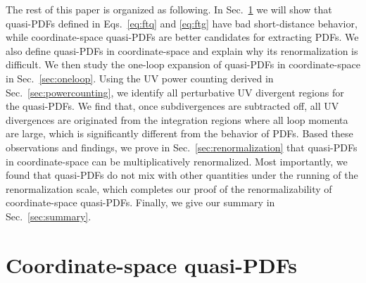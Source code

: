 \documentclass[twocolumn,aps,prd,superscriptaddress,nofootinbib,showpacs]{revtex4}
\begin{document}
The rest of this paper is organized as following.
In Sec.~\ref{sec:def} we will show that quasi-PDFs defined in Eqs.~\eqref{eq:ftq} and \eqref{eq:ftg} have bad short-distance behavior, while coordinate-space quasi-PDFs are better candidates for extracting PDFs. We also define quasi-PDFs in coordinate-space and explain why its renormalization is difficult. We then study the one-loop expansion of quasi-PDFs in coordinate-space in Sec.~\ref{sec:oneloop}. Using the UV power counting derived in Sec.~\ref{sec:powercounting}, we identify all  perturbative UV divergent regions for the quasi-PDFs.  We find that, once subdivergences are subtracted off, all UV divergences are originated from the integration regions where all loop momenta are large, which is significantly different from the behavior of PDFs.
Based these observations and findings, we prove  in Sec.~\ref{sec:renormalization} that quasi-PDFs in coordinate-space can be multiplicatively renormalized. Most importantly, we found that quasi-PDFs do not mix with other quantities under the running of the renormalization scale, which completes our proof of the renormalizability of coordinate-space quasi-PDFs.  Finally, we give our summary in Sec.~\ref{sec:summary}.

\section{Coordinate-space quasi-PDFs}
\label{sec:def}
\end{document}
